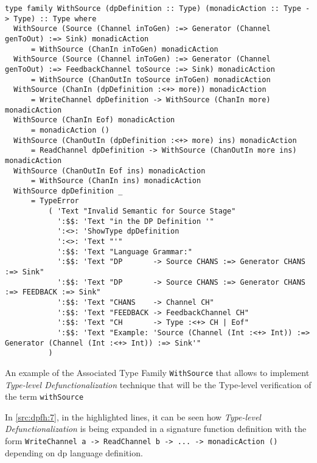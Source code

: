 \begin{listing}[b!]
 \scriptsize{
  \begin{verbatim}
type family WithSource (dpDefinition :: Type) (monadicAction :: Type -> Type) :: Type where
  WithSource (Source (Channel inToGen) :=> Generator (Channel genToOut) :=> Sink) monadicAction
      = WithSource (ChanIn inToGen) monadicAction
  WithSource (Source (Channel inToGen) :=> Generator (Channel genToOut) :=> FeedbackChannel toSource :=> Sink) monadicAction 
      = WithSource (ChanOutIn toSource inToGen) monadicAction
  WithSource (ChanIn (dpDefinition :<+> more)) monadicAction         
      = WriteChannel dpDefinition -> WithSource (ChanIn more) monadicAction
  WithSource (ChanIn Eof) monadicAction                              
      = monadicAction ()
  WithSource (ChanOutIn (dpDefinition :<+> more) ins) monadicAction  
      = ReadChannel dpDefinition -> WithSource (ChanOutIn more ins) monadicAction
  WithSource (ChanOutIn Eof ins) monadicAction                       
      = WithSource (ChanIn ins) monadicAction
  WithSource dpDefinition _                                          
      = TypeError
          ( 'Text "Invalid Semantic for Source Stage"
            ':$$: 'Text "in the DP Definition '"
            ':<>: 'ShowType dpDefinition
            ':<>: 'Text "'"
            ':$$: 'Text "Language Grammar:"
            ':$$: 'Text "DP       -> Source CHANS :=> Generator CHANS :=> Sink"
            ':$$: 'Text "DP       -> Source CHANS :=> Generator CHANS :=> FEEDBACK :=> Sink"
            ':$$: 'Text "CHANS    -> Channel CH"
            ':$$: 'Text "FEEDBACK -> FeedbackChannel CH"
            ':$$: 'Text "CH       -> Type :<+> CH | Eof"
            ':$$: 'Text "Example: 'Source (Channel (Int :<+> Int)) :=> Generator (Channel (Int :<+> Int)) :=> Sink'"
          )
  \end{verbatim}
  }
  \caption[{[\texttt{Stage.hs}] WithSource Associate Type Details}]{An example of the Associated Type Family \texttt{WithSource} that allows to implement \emph{Type-level Defunctionalization} technique that will be the Type-level verification of the term \texttt{withSource}}
  \label{src:dpfh:7}
\end{listing}

In \autoref{src:dpfh:7}, in the highlighted lines, it can be seen how \emph{Type-level Defunctionalization} is being expanded in a signature function definition with the form \texttt{WriteChannel a -> ReadChannel b -> ... -> monadicAction ()} depending on \acrshort{dp} language definition. 

